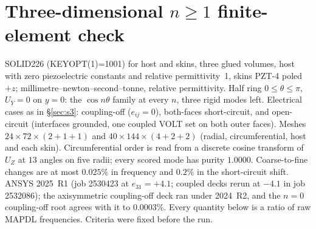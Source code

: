 \documentclass[11pt]{article}
\begin{document}
\section{Three-dimensional $n\ge1$ finite-element check}
\label{sec:s9}
SOLID226 (KEYOPT(1)=1001) for host and skins, three glued volumes, host
with zero piezoelectric constants and relative permittivity~1, skins
PZT-4 poled $+z$; millimetre--newton--second--tonne, relative
permittivity. Half ring $0\le\theta\le\pi$, $U_Y=0$ on $y=0$: the
$\cos n\theta$ family at every $n$, three rigid modes left. Electrical
cases as in \S\ref{sec:s3}: coupling-off ($e_{ij}=0$), both-faces
short-circuit, and open-circuit (interfaces grounded, one coupled VOLT
set on both outer faces). Meshes $24\times72\times(2+1+1)$ and
$40\times144\times(4+2+2)$ (radial, circumferential, host and each
skin). Circumferential order is read from a discrete cosine transform of
$U_Z$ at $13$ angles on five radii; every scored mode has purity
$1.0000$. Coarse-to-fine changes are at most $0.025\%$ in frequency and
$0.2\%$ in the short-circuit shift. ANSYS 2025~R1 (job 2530423 at
$e_{31}=+4.1$; coupled decks rerun at $-4.1$ in job 2532086); the
axisymmetric coupling-off deck ran under 2024~R2, and the $n=0$
coupling-off root agrees with it to $0.0003\%$.
Every quantity below is a ratio of raw MAPDL frequencies. Criteria were
fixed before the run.
\end{document}
